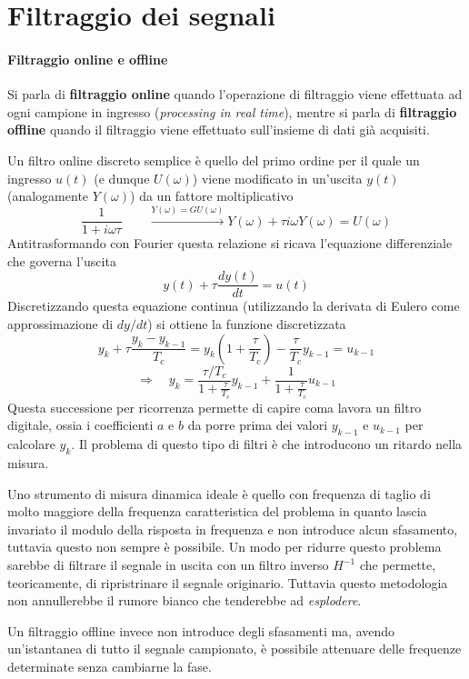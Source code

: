 \section{Filtraggio dei segnali}

	\paragraph{Filtraggio online e offline} Si parla di \textbf{filtraggio online} quando l'operazione di filtraggio viene effettuata ad ogni campione in ingresso (\textit{processing in real time}), mentre si parla di \textbf{filtraggio offline} quando il filtraggio viene effettuato sull'insieme di dati già acquisiti.
	
	Un filtro online discreto semplice è quello del primo ordine per il quale un ingresso $u(t)$ (e dunque $U(\omega)$) viene modificato in un'uscita $y(t)$ (analogamente $Y(\omega)$) da un fattore moltiplicativo
	\[ \frac 1 {1 + i\omega \tau} \qquad \xrightarrow{Y(\omega) = G U(\omega)} Y(\omega) + \tau i \omega Y(\omega) = U(\omega) \]
	Antitrasformando con Fourier questa relazione si ricava l'equazione differenziale che governa l'uscita
	\[y(t) + \tau \frac{dy(t)}{dt} = u(t)\]
	Discretizzando questa equazione continua (utilizzando la derivata di Eulero come approssimazione di $dy/dt$) si ottiene la funzione discretizzata
	\[ y_k + \tau \frac{y_k - y_{k-1}}{T_c} = y_k \left(1 + \frac \tau {T_c} \right) - \frac \tau {T_c} y_{k-1} = u_{k-1} \]
	\[  \Rightarrow \quad y_k = \frac{\tau / T_c}{1 + \frac{\tau}{T_c}} y_{k-1} + \frac 1  { 1+ \frac \tau {T_c}} u_{k-1} \]
	Questa successione per ricorrenza permette di capire coma lavora un filtro digitale, ossia i coefficienti $a$ e $b$ da porre prima dei valori $y_{k-1}$ e $u_{k-1}$ per calcolare $y_k$. Il problema di questo tipo di filtri è che introducono un ritardo nella misura.
	
	Uno strumento di misura dinamica ideale è quello con frequenza di taglio di molto maggiore della frequenza caratteristica del problema in quanto lascia invariato il modulo della risposta in frequenza e non introduce alcun sfasamento, tuttavia questo non sempre è possibile. Un modo per ridurre questo problema sarebbe di filtrare il segnale in uscita con un filtro inverso $H^{-1}$ che permette, teoricamente, di ripristrinare il segnale originario. Tuttavia questo metodologia non annullerebbe il rumore bianco che tenderebbe ad \textit{esplodere}. 
	
	\vspace{3mm}
	Un filtraggio offline invece non introduce degli sfasamenti ma, avendo un'istantanea di tutto il segnale campionato, è possibile attenuare delle frequenze determinate senza cambiarne la fase.
	
